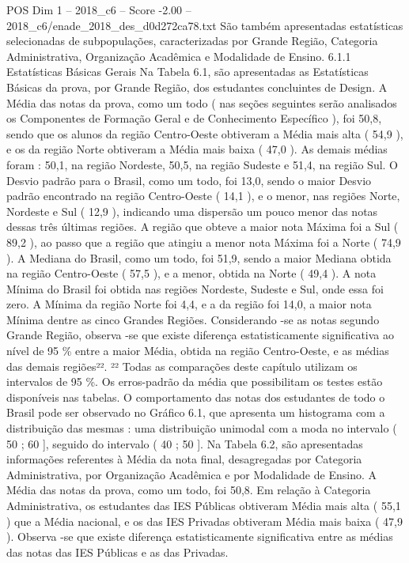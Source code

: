\begin{textsample}{POS Dim 1 – 2018\_c6 – Score -2.00 – 2018\_c6/enade\_2018\_des\_d0d272ca78.txt}
São também apresentadas estatísticas selecionadas de subpopulações, caracterizadas por Grande Região, Categoria Administrativa, Organização Acadêmica e Modalidade de Ensino. 6.1.1 Estatísticas Básicas Gerais Na Tabela 6.1, são apresentadas as Estatísticas Básicas da prova, por Grande Região, dos estudantes concluintes de Design.
A Média das notas da prova, como um todo ( nas seções seguintes serão analisados os Componentes de Formação Geral e de Conhecimento Específico ), foi 50,8, sendo que os alunos da região Centro-Oeste obtiveram a Média mais alta ( 54,9 ), e os da região Norte obtiveram a Média mais baixa ( 47,0 ).
As demais médias foram : 50,1, na região Nordeste, 50,5, na região Sudeste e 51,4, na região Sul.
O Desvio padrão para o Brasil, como um todo, foi 13,0, sendo o maior Desvio padrão encontrado na região Centro-Oeste ( 14,1 ), e o menor, nas regiões Norte, Nordeste e Sul ( 12,9 ), indicando uma dispersão um pouco menor das notas dessas três últimas regiões.
A região que obteve a maior nota Máxima foi a Sul ( 89,2 ), ao passo que a região que atingiu a menor nota Máxima foi a Norte ( 74,9 ).
A Mediana do Brasil, como um todo, foi 51,9, sendo a maior Mediana obtida na região Centro-Oeste ( 57,5 ), e a menor, obtida na Norte ( 49,4 ).
A nota Mínima do Brasil foi obtida nas regiões Nordeste, Sudeste e Sul, onde essa foi zero.
A Mínima da região Norte foi 4,4, e a da região foi 14,0, a maior nota Mínima dentre as cinco Grandes Regiões.
Considerando -se as notas segundo Grande Região, observa -se que existe diferença estatisticamente significativa ao nível de 95 \% entre a maior Média, obtida na região Centro-Oeste, e as médias das demais regiões²². ²² Todas as comparações deste capítulo utilizam os intervalos de 95 \%.
Os erros-padrão da média que possibilitam os testes estão disponíveis nas tabelas.
O comportamento das notas dos estudantes de todo o Brasil pode ser observado no Gráfico 6.1, que apresenta um histograma com a distribuição das mesmas : uma distribuição unimodal com a moda no intervalo ( 50 ; 60 ], seguido do intervalo ( 40 ; 50 ].
Na Tabela 6.2, são apresentadas informações referentes à Média da nota final, desagregadas por Categoria Administrativa, por Organização Acadêmica e por Modalidade de Ensino.
A Média das notas da prova, como um todo, foi 50,8.
Em relação à Categoria Administrativa, os estudantes das IES Públicas obtiveram Média mais alta ( 55,1 ) que a Média nacional, e os das IES Privadas obtiveram Média mais baixa ( 47,9 ).
Observa -se que existe diferença estatisticamente significativa entre as médias das notas das IES Públicas e as das Privadas.

\end{textsample}
